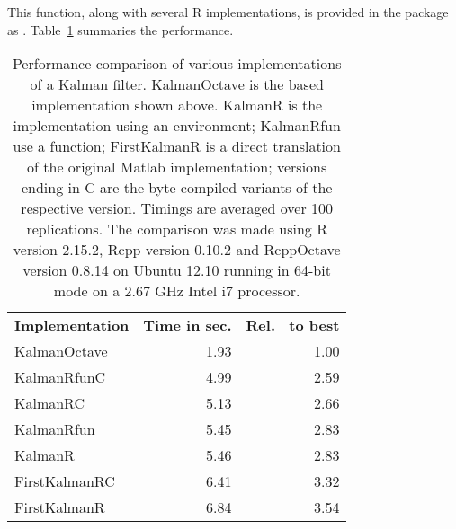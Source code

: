 This function, along with several R implementations, is provided in the
 package as . %
Table~\ref{tab:benchmark} summaries the performance.


\begin{table}[tb]
  \begin{center}
    \begin{small}
      \begin{tabular}{lrr}
        \toprule
        {\bf Implementation \phantom{XX}} & {\bf Time in sec.} & {\bf Rel.~ to best} \\
        \cmidrule(r){1-3}
         KalmanOctave  & 1.93 & 1.00 \\
          KalmanRfunC  & 4.99 & 2.59 \\
             KalmanRC  & 5.13 & 2.66 \\
           KalmanRfun  & 5.45 & 2.83 \\
              KalmanR  & 5.46 & 2.83 \\
        FirstKalmanRC  & 6.41 & 3.32 \\
         FirstKalmanR  & 6.84 & 3.54 \\
         \bottomrule
      \end{tabular}
      \caption{Performance comparison of various implementations of a Kalman filter.
        KalmanOctave is the  based implementation shown above.
        KalmanR is the \R implementation using an environment; KalmanRfun use a
        function; FirstKalmanR is a direct translation of the original Matlab
        implementation; versions ending in C are the byte-compiled variants of
        the respective version.  Timings are averaged over 100 replications.
        The comparison was made using R version 2.15.2, Rcpp version 0.10.2 and
        RcppOctave version 0.8.14 on Ubuntu 12.10 running in 64-bit mode on a
        2.67 GHz Intel i7 processor.}
      \label{tab:benchmark}
    \end{small}
  \end{center}
\end{table}


